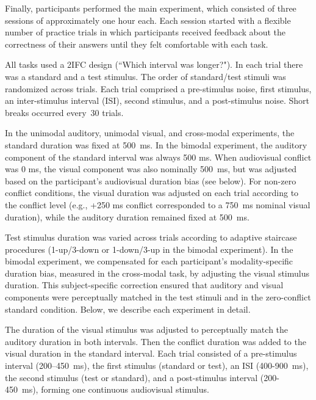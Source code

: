 \documentclass{jov}
\begin{document}
Finally, participants performed the main experiment, which consisted of three sessions of approximately one hour each. Each session started with a flexible number of practice trials in which participants received feedback about the correctness of their answers until they felt comfortable with each task.

All tasks used a 2IFC design (``Which interval was longer?"). In each trial there was a standard and a test stimulus. The order of standard/test stimuli was randomized across trials. Each trial comprised a pre-stimulus noise, first stimulus, an inter-stimulus interval (ISI), second stimulus, and a post-stimulus noise. Short breaks occurred every~30 trials.

In the unimodal auditory, unimodal visual, and cross-modal experiments, the standard duration was fixed at 500~ms. In the bimodal experiment, the auditory component of the standard interval was always 500 ms. When audiovisual conflict was 0 ms, the visual component was also nominally 500~ms, but was adjusted based on the participant's audiovisual duration bias (see below). For non-zero conflict conditions, the visual duration was adjusted on each trial according to the conflict level (e.g., +250 ms conflict corresponded to a 750~ms nominal visual duration), while the auditory duration remained fixed at 500~ms.

Test stimulus duration was varied across trials according to adaptive staircase procedures (1-up/3-down or 1-down/3-up in the bimodal experiment). In the bimodal experiment, we compensated for each participant's modality-specific duration bias, measured in the cross-modal task, by adjusting the visual stimulus duration. This subject-specific correction ensured that auditory and visual components were perceptually matched in the test stimuli and in the zero-conflict standard condition. Below, we describe each experiment in detail.

The duration of the visual stimulus was adjusted to perceptually match the auditory duration in both intervals. Then the conflict duration was added to the visual duration in the standard interval. Each trial consisted of a pre-stimulus interval (200--450~ms), the first stimulus (standard or test), an ISI (400-900~ms), the second stimulus (test or standard), and a post-stimulus interval (200-450~ms), forming one continuous audiovisual stimulus.
\end{document}
